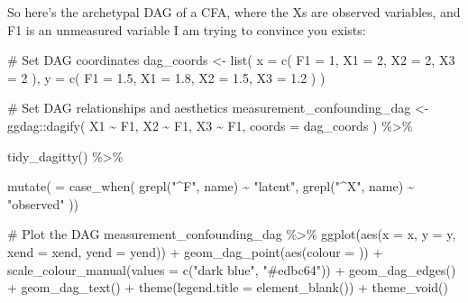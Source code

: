 \documentclass[
  letterpaper,
  DIV=11,
  numbers=noendperiod]{scrreprt}
\newenvironment{Shaded}{\begin{snugshade}}{\end{snugshade}}
\newcommand{\AttributeTok}[1]{\textcolor[rgb]{0.40,0.45,0.13}{#1}}
\newcommand{\CommentTok}[1]{\textcolor[rgb]{0.37,0.37,0.37}{#1}}
\newcommand{\DecValTok}[1]{\textcolor[rgb]{0.68,0.00,0.00}{#1}}
\newcommand{\FloatTok}[1]{\textcolor[rgb]{0.68,0.00,0.00}{#1}}
\newcommand{\FunctionTok}[1]{\textcolor[rgb]{0.28,0.35,0.67}{#1}}
\newcommand{\NormalTok}[1]{\textcolor[rgb]{0.00,0.23,0.31}{#1}}
\newcommand{\OtherTok}[1]{\textcolor[rgb]{0.00,0.23,0.31}{#1}}
\newcommand{\SpecialCharTok}[1]{\textcolor[rgb]{0.37,0.37,0.37}{#1}}
\newcommand{\StringTok}[1]{\textcolor[rgb]{0.13,0.47,0.30}{#1}}
\begin{document}
So here's the archetypal DAG of a CFA, where the Xs are observed
variables, and F1 is an unmeasured variable I am trying to convince you
exists:

\begin{Shaded}
\begin{Highlighting}[]
\CommentTok{\# Set DAG coordinates}
\NormalTok{dag\_coords }\OtherTok{\textless{}{-}} \FunctionTok{list}\NormalTok{(}
  \AttributeTok{x =} \FunctionTok{c}\NormalTok{(}
    \AttributeTok{F1 =} \DecValTok{1}\NormalTok{, }
    \AttributeTok{X1 =} \DecValTok{2}\NormalTok{,}
    \AttributeTok{X2 =} \DecValTok{2}\NormalTok{,}
    \AttributeTok{X3 =} \DecValTok{2}
\NormalTok{  ),}
  \AttributeTok{y =} \FunctionTok{c}\NormalTok{(}
    \AttributeTok{F1 =} \FloatTok{1.5}\NormalTok{,}
    \AttributeTok{X1 =} \FloatTok{1.8}\NormalTok{,}
    \AttributeTok{X2 =} \FloatTok{1.5}\NormalTok{,}
    \AttributeTok{X3 =} \FloatTok{1.2}
\NormalTok{  )}
\NormalTok{)}

\CommentTok{\# Set DAG relationships and aesthetics}
\NormalTok{measurement\_confounding\_dag }\OtherTok{\textless{}{-}}\NormalTok{ ggdag}\SpecialCharTok{::}\FunctionTok{dagify}\NormalTok{(}
\NormalTok{  X1 }\SpecialCharTok{\textasciitilde{}}\NormalTok{ F1,}
\NormalTok{  X2 }\SpecialCharTok{\textasciitilde{}}\NormalTok{ F1,}
\NormalTok{  X3 }\SpecialCharTok{\textasciitilde{}}\NormalTok{ F1,}
  \AttributeTok{coords =}\NormalTok{ dag\_coords}
\NormalTok{) }\SpecialCharTok{\%\textgreater{}\%} 
  
  \FunctionTok{tidy\_dagitty}\NormalTok{() }\SpecialCharTok{\%\textgreater{}\%} 
  
  \FunctionTok{mutate}\NormalTok{(}
    \StringTok{\textasciigrave{}}\AttributeTok{ }\StringTok{\textasciigrave{}} \OtherTok{=} \FunctionTok{case\_when}\NormalTok{(}
      \FunctionTok{grepl}\NormalTok{(}\StringTok{"\^{}F"}\NormalTok{, name) }\SpecialCharTok{\textasciitilde{}} \StringTok{"latent"}\NormalTok{,}
      \FunctionTok{grepl}\NormalTok{(}\StringTok{"\^{}X"}\NormalTok{, name) }\SpecialCharTok{\textasciitilde{}} \StringTok{"observed"}
\NormalTok{    ))}

\CommentTok{\# Plot the DAG}
\NormalTok{measurement\_confounding\_dag }\SpecialCharTok{\%\textgreater{}\%}
  \FunctionTok{ggplot}\NormalTok{(}\FunctionTok{aes}\NormalTok{(}\AttributeTok{x =}\NormalTok{ x, }\AttributeTok{y =}\NormalTok{ y, }\AttributeTok{xend =}\NormalTok{ xend, }\AttributeTok{yend =}\NormalTok{ yend)) }\SpecialCharTok{+}
  \FunctionTok{geom\_dag\_point}\NormalTok{(}\FunctionTok{aes}\NormalTok{(}\AttributeTok{colour =} \StringTok{\textasciigrave{}}\AttributeTok{ }\StringTok{\textasciigrave{}}\NormalTok{)) }\SpecialCharTok{+}
  \FunctionTok{scale\_colour\_manual}\NormalTok{(}\AttributeTok{values =} \FunctionTok{c}\NormalTok{(}\StringTok{"dark blue"}\NormalTok{, }\StringTok{"\#edbc64"}\NormalTok{)) }\SpecialCharTok{+} 
  \FunctionTok{geom\_dag\_edges}\NormalTok{() }\SpecialCharTok{+}
  \FunctionTok{geom\_dag\_text}\NormalTok{() }\SpecialCharTok{+}
  \FunctionTok{theme}\NormalTok{(}\AttributeTok{legend.title =} \FunctionTok{element\_blank}\NormalTok{()) }\SpecialCharTok{+}
  \FunctionTok{theme\_void}\NormalTok{()}
\end{Highlighting}
\end{Shaded}
\end{document}
